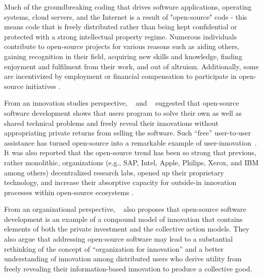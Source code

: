 \documentclass[CHICAGO,Times1COL]{WileyNJDv5} %
\begin{document}
%
%
%

Much of the groundbreaking coding that drives software applications, operating systems, cloud servers, and the Internet is a result of "open-source" code - this means
code that is freely distributed rather than being kept confidential or protected with a strong intellectual property regime. Numerous individuals contribute to
open-source projects for various reasons such as aiding others, gaining recognition in their field, acquiring new skills and knowledge, finding enjoyment and fulfilment
from their work, and out of altruism. Additionally, some are incentivized by employment or financial compensation to participate in open-source
initiatives \citep{GerosaWiese_et_al2021}.

From an innovation studies perspective, ~\citet{lakhani_how_2003} and ~\citet{von2005democratizing} suggested that open-source software development shows that users
program to solve their own as well as shared technical problems and freely reveal their innovations without appropriating private returns from selling the
software. Such ``free'' user-to-user assistance has turned open-source into a remarkable example of user-innovation~\citep{von2005democratizing}. It was also
reported that the open-source trend has been so strong that previous, rather monolithic, organizations (e.g., SAP, Intel, Apple, Philips, Xerox, and IBM among others)
decentralized research labs, opened up their proprietary technology,  and increase their absorptive capacity for outside-in innovation processes within open-source ecosystems
\citep{chesbrough2006open}.


From an organizational perspective, ~\citet{hippel2003open} also proposes that open-source software development is an example of a compound model of innovation that contains elements of both the private investment and the  collective action models.  They also argue that addressing open-source software may lead to a substantial rethinking of the concept of ``organization for innovation'' and a better  understanding of innovation among distributed users who derive utility from freely revealing their information-based innovation to produce a collective good.
\end{document}
